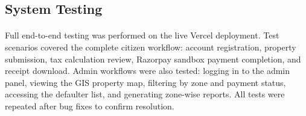 \subsection{System Testing}
\paragraph{}Full end-to-end testing was performed on the live Vercel deployment. Test scenarios covered the complete citizen workflow: account registration, property submission, tax calculation review, Razorpay sandbox payment completion, and receipt download. Admin workflows were also tested: logging in to the admin panel, viewing the GIS property map, filtering by zone and payment status, accessing the defaulter list, and generating zone-wise reports. All tests were repeated after bug fixes to confirm resolution.


